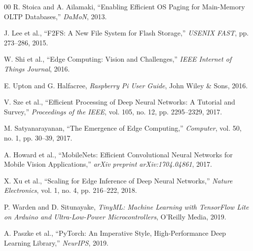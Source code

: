 \documentclass[conference]{IEEEtran}
\begin{document}
\begin{thebibliography}{00}
 R. Stoica and A. Ailamaki, ``Enabling Efficient OS Paging for Main-Memory OLTP Databases,'' \textit{DaMoN}, 2013.

 J. Lee et al., ``F2FS: A New File System for Flash Storage,'' \textit{USENIX FAST}, pp. 273--286, 2015.

 W. Shi et al., ``Edge Computing: Vision and Challenges,'' \textit{IEEE Internet of Things Journal}, 2016.


 E. Upton and G. Halfacree, \textit{Raspberry Pi User Guide}, John Wiley \& Sons, 2016.


 V. Sze et al., ``Efficient Processing of Deep Neural Networks: A Tutorial and Survey,'' \textit{Proceedings of the IEEE}, vol. 105, no. 12, pp. 2295--2329, 2017.

 M. Satyanarayanan, ``The Emergence of Edge Computing,'' \textit{Computer}, vol. 50, no. 1, pp. 30--39, 2017.


 A. Howard et al., ``MobileNets: Efficient Convolutional Neural Networks for Mobile Vision Applications,'' \textit{arXiv preprint arXiv:1704.04861}, 2017.

 X. Xu et al., ``Scaling for Edge Inference of Deep Neural Networks,'' \textit{Nature Electronics}, vol. 1, no. 4, pp. 216--222, 2018.

 P. Warden and D. Situnayake, \textit{TinyML: Machine Learning with TensorFlow Lite on Arduino and Ultra-Low-Power Microcontrollers}, O'Reilly Media, 2019.

 A. Paszke et al., ``PyTorch: An Imperative Style, High-Performance Deep Learning Library,'' \textit{NeurIPS}, 2019.

\end{thebibliography}
\end{document}

